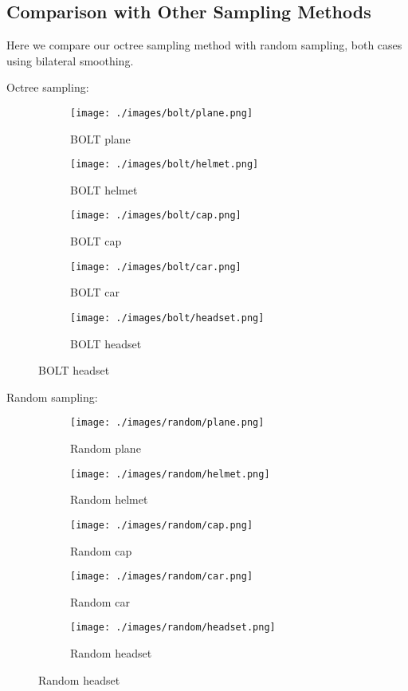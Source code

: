 \subsection{Comparison with Other Sampling Methods}

Here we compare our octree sampling method with random sampling, both cases using bilateral smoothing.

Octree sampling:

\begin{figure}[H]
	\centering
	\begin{subfigure}{0.18\textwidth}
		\texttt{[image: ./images/bolt/plane.png]}
		\caption{BOLT plane}
	\end{subfigure}
	\begin{subfigure}{0.18\textwidth}
		\texttt{[image: ./images/bolt/helmet.png]}
		\caption{BOLT helmet}
	\end{subfigure}
	\begin{subfigure}{0.18\textwidth}
		\texttt{[image: ./images/bolt/cap.png]}
		\caption{BOLT cap}
	\end{subfigure}
	\begin{subfigure}{0.18\textwidth}
		\texttt{[image: ./images/bolt/car.png]}
		\caption{BOLT car}
	\end{subfigure}
	\begin{subfigure}{0.18\textwidth}
		\texttt{[image: ./images/bolt/headset.png]}
		\caption{BOLT headset}
	\end{subfigure}
\end{figure}

Random sampling:

\begin{figure}[H]
	\centering
	\begin{subfigure}{0.18\textwidth}
		\texttt{[image: ./images/random/plane.png]}
		\caption{Random plane}
	\end{subfigure}
	\begin{subfigure}{0.18\textwidth}
		\texttt{[image: ./images/random/helmet.png]}
		\caption{Random helmet}
	\end{subfigure}
	\begin{subfigure}{0.18\textwidth}
		\texttt{[image: ./images/random/cap.png]}
		\caption{Random cap}
	\end{subfigure}
	\begin{subfigure}{0.18\textwidth}
		\texttt{[image: ./images/random/car.png]}
		\caption{Random car}
	\end{subfigure}
	\begin{subfigure}{0.18\textwidth}
		\texttt{[image: ./images/random/headset.png]}
		\caption{Random headset}
	\end{subfigure}
\end{figure}

